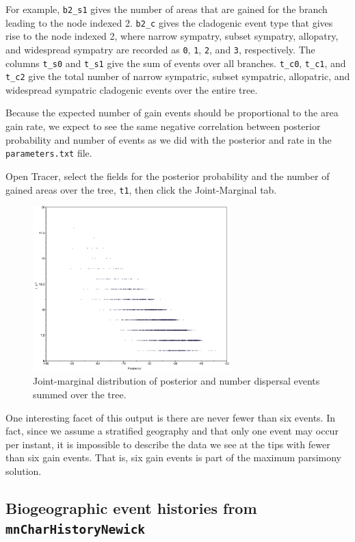 \documentclass[11pt]{article}
\begin{document}
For example, {\tt b2\_s1} gives the number of areas that are gained for the branch leading to the node indexed 2.
{\tt b2\_c} gives the cladogenic event type that gives rise to the node indexed 2, where narrow sympatry, subset sympatry, allopatry, and widespread sympatry are recorded as {\tt 0}, {\tt 1}, {\tt 2}, and {\tt 3}, respectively. The columns {\tt t\_s0} and {\tt t\_s1} give the sum of events over all branches. {\tt t\_c0}, {\tt t\_c1}, and {\tt t\_c2} give the total number of narrow sympatric, subset sympatric, allopatric, and widespread sympatric cladogenic events over the entire tree.

Because the expected number of gain events should be proportional to the area gain rate, we expect to see the same negative correlation between posterior probability and number of events as we did with the posterior and rate in the {\tt parameters.txt} file.

Open Tracer, select the fields for the posterior probability and the number of gained areas over the tree, {\tt t1}, then click the Joint-Marginal tab.

\begin{figure}[H]
\centering
\includegraphics[width=3in]{figures/joint_ngain_posterior}
\caption{Joint-marginal distribution of posterior and number dispersal events summed over the tree.}
\end{figure}

One interesting facet of this output is there are never fewer than six events.
In fact, since we assume a stratified geography and that only one event may occur per instant, it is impossible to describe the data we see at the tips with fewer than six gain events.
That is, six gain events is part of the maximum parsimony solution.

\subsection{Biogeographic event histories from {\tt mnCharHistoryNewick}}
\end{document}
